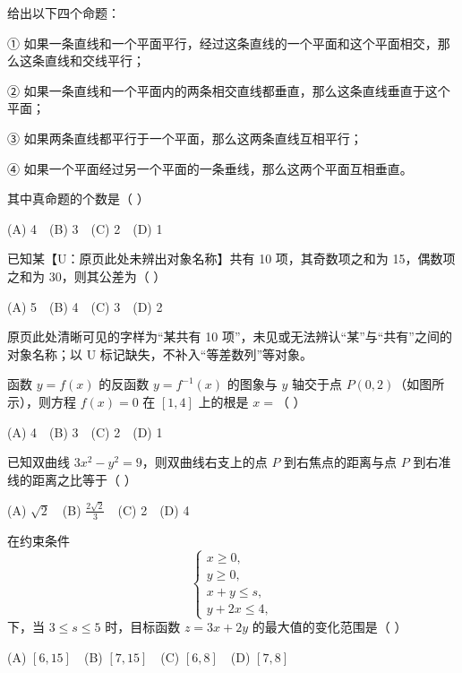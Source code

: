 \begin{question}
给出以下四个命题：

① 如果一条直线和一个平面平行，经过这条直线的一个平面和这个平面相交，那么这条直线和交线平行；

② 如果一条直线和一个平面内的两条相交直线都垂直，那么这条直线垂直于这个平面；

③ 如果两条直线都平行于一个平面，那么这两条直线互相平行；

④ 如果一个平面经过另一个平面的一条垂线，那么这两个平面互相垂直。

其中真命题的个数是（  ）

(A) 4　(B) 3　(C) 2　(D) 1

\end{question}
\begin{question}
已知某【U：原页此处未辨出对象名称】共有 10 项，其奇数项之和为 15，偶数项之和为 30，则其公差为（  ）

(A) 5　(B) 4　(C) 3　(D) 2

\begin{gktip}
原页此处清晰可见的字样为“某共有 10 项”，未见或无法辨认“某”与“共有”之间的对象名称；以 U 标记缺失，不补入“等差数列”等对象。
\end{gktip}

\Needspace{0.4\textheight}
\end{question}
\begin{question}
函数 \(y=f(x)\) 的反函数 \(y=f^{-1}(x)\) 的图象与 \(y\) 轴交于点 \(P(0,2)\)（如图所示），则方程 \(f(x)=0\) 在 \([1,4]\) 上的根是 \(x=\)（  ）

(A) 4　(B) 3　(C) 2　(D) 1
\nopagebreak[4]
\begin{center}\end{center}
\nopagebreak[4]
\end{question}
\begin{question}
已知双曲线 \(3x^2-y^2=9\)，则双曲线右支上的点 \(P\) 到右焦点的距离与点 \(P\) 到右准线的距离之比等于（  ）

(A) \(\sqrt2\)　(B) \(\frac{2\sqrt2}{3}\)　(C) 2　(D) 4

\end{question}
\begin{question}
在约束条件
\nopagebreak[4]
\[
\begin{cases}
x\geq 0,\\
y\geq 0,\\
x+y\leq s,\\
y+2x\leq 4,
\end{cases}
\]
下，当 \(3\leq s\leq5\) 时，目标函数 \(z=3x+2y\) 的最大值的变化范围是（  ）

(A) \([6,15]\)　(B) \([7,15]\)　(C) \([6,8]\)　(D) \([7,8]\)

\end{question}
